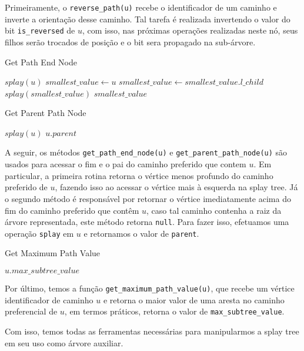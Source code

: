 Primeiramente, o \texttt{reverse\_path(u)} recebe o identificador de um caminho e inverte a orientação desse caminho. Tal tarefa é realizada invertendo o valor do bit \texttt{is\_reversed} de $u$, com isso, nas próximas operações realizadas neste nó, seus filhos serão trocados de posição e o bit sera propagado na sub-árvore.

\begin{algorithm}[h!]
    \caption{Get Path End Node}\label{splay:get-path-end}
    \begin{algorithmic}
        \State $splay(u)$
        \State $smallest\_value \gets u$
        \State $smallest\_value \gets smallest\_value.l\_child$
        \EndWhile
        \State $splay(smallest\_value)$ 
        \State \Return $smallest\_value$
        \EndFunction
    \end{algorithmic}
\end{algorithm}

\begin{algorithm}[h!]
    \caption{Get Parent Path Node}\label{splay:get-parent-path}
    \begin{algorithmic}
        \State $splay(u)$
        \State \Return $u.parent$
        \EndFunction
    \end{algorithmic}
\end{algorithm}

A seguir, os métodos \texttt{get\_path\_end\_node(u)} e \texttt{get\_parent\_path\_node(u)} são usados para acessar o fim e o pai do caminho preferido que contem $u$. Em particular, a primeira rotina retorna o vértice menos profundo do caminho preferido de $u$, fazendo isso ao acessar o vértice mais à esquerda na splay tree. Já o segundo método é responsável por retornar o vértice imediatamente acima do fim do caminho preferido que contêm $u$, caso tal caminho contenha a raiz da árvore representada, este método retorna \texttt{null}. Para fazer isso, efetuamos uma operação \texttt{splay} em $u$ e retornamos o valor de \texttt{parent}.

\begin{algorithm}[h!]
    \caption{Get Maximum Path Value}\label{splay:get-maximum-value}
    \begin{algorithmic}
        \State \Return $u.max\_subtree\_value$
        \EndFunction
    \end{algorithmic}
\end{algorithm}

Por último, temos a função \texttt{get\_maximum\_path\_value(u)}, que recebe um vértice identificador de caminho $u$ e retorna o maior valor de uma aresta no caminho preferencial de $u$, em termos práticos, retorna o valor de \texttt{max\_subtree\_value}.

Com isso, temos todas as ferramentas necessárias para manipularmos a splay tree em seu uso como árvore auxiliar.
